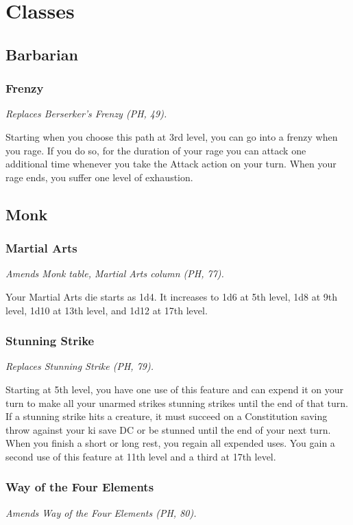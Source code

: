 \documentclass[letterpaper,twocolumn,openany,nodeprecatedcode]{dndbook}
\begin{document}
\label{balance-classes}
\section{Classes}

\subsection{Barbarian}
\subsubsection{Frenzy}
\textit{Replaces Berserker's Frenzy (PH, 49).}

Starting when you choose this path at 3rd level, you can go into a frenzy when you rage. If you do so, for the duration of your rage you can attack one additional time whenever you take the Attack action on your turn. When your rage ends, you suffer one level of exhaustion.

\subsection{Monk}

\subsubsection{Martial Arts}
\textit{Amends Monk table, Martial Arts column (PH, 77).}

Your Martial Arts die starts as 1d4. It increases to 1d6 at 5th level, 1d8 at 9th level, 1d10 at 13th level, and 1d12 at 17th level.

\subsubsection{Stunning Strike}
\textit{Replaces Stunning Strike (PH, 79).}

Starting at 5th level, you have one use of this feature and can expend it on your turn to make all your unarmed strikes stunning strikes until the end of that turn. If a stunning strike hits a creature, it must succeed on a Constitution saving throw against your ki save DC or be stunned until the end of your next turn. When you finish a short or long rest, you regain all expended uses. You gain a second use of this feature at 11th level and a third at 17th level. 

\subsubsection{Way of the Four Elements}
\textit{Amends Way of the Four Elements (PH, 80).}
\end{document}
